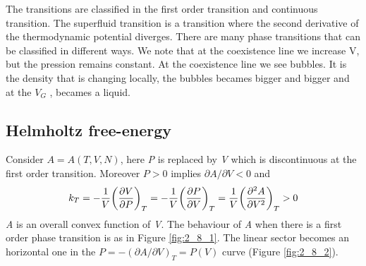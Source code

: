 \documentclass[../main/main.tex]{subfiles}
\begin{document}
The transitions are classified in the first order transition and continuous transition. The superfluid transition is a transition where the second derivative of the thermodynamic potential diverges. There are many phase transitions that can be classified in different ways.
We note that at the coexistence line we increase V, but the pression remains constant. At the coexistence line we see bubbles. It is the density that is changing locally, the bubbles becames bigger and bigger and at the \( V_G \) , becames a liquid.


\subsection{Helmholtz free-energy}
Consider \( A = A (T,V,N) \), here \emph{P} is replaced by \emph{V} which is discontinuous at the first order transition. Moreover \( P > 0 \)  implies \( \partial{A}/\partial{V} < 0   \) and
\begin{equation}
  k_T = -\frac{1}{V} \qty(\pdv{V}{P} )_T = -\frac{1}{V} \qty(\pdv{P}{V} )_T = \frac{1}{V} \qty(\pdv[2]{A}{V} )_T > 0
  \label{eq:}
\end{equation}
\emph{A} is an overall convex function of \emph{V}.
The behaviour of \emph{A} when there is a first order phase transition is as in Figure \ref{fig:2_8_1}. The linear sector becomes an horizontal one in the \( P = - (\partial{A}/\partial{V}  )_T = P (V) \) curve (Figure \ref{fig:2_8_2}).
\end{document}
